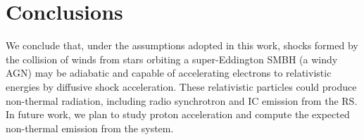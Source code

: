 \documentclass[baaa]{baaa}
\begin{document}
\vspace{-1em}


\section{Conclusions}\label{S_conclusions}
We conclude that, under the assumptions adopted in this work, shocks formed by the collision of winds from stars orbiting a super-Eddington SMBH (a windy AGN) may be adiabatic and capable of accelerating electrons to relativistic energies by diffusive shock acceleration. These relativistic particles could produce non-thermal radiation, including radio synchrotron and IC emission from the RS. In future work, we plan to study proton acceleration and compute the expected non-thermal emission from the system.







\small

\end{document}
